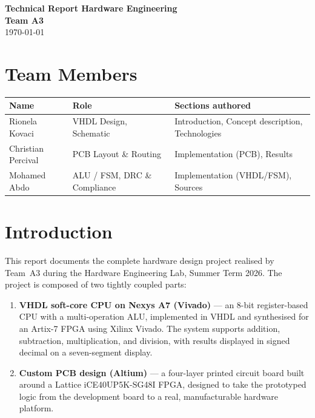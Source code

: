 \documentclass[11pt,a4paper]{article}
\begin{document}
\setlength{\parskip}{5pt}

\begin{center}
  {\LARGE\bfseries Technical Report Hardware Engineering}\\[0.35cm]
  {\large\bfseries Team A3}\\[0.15cm]
  {\large\today}
\end{center}

\vspace{0.3cm}
\tableofcontents


\section*{Team Members}

\begin{center}
\begin{tabular}{lll}
  \toprule
  \textbf{Name} & \textbf{Role} & \textbf{Sections authored} \\
  \midrule
  Rionela Kovaci    & VHDL Design, Schematic      & Introduction, Concept description, Technologies \\
  Christian Percival & PCB Layout \& Routing       & Implementation (PCB), Results \\
  Mohamed Abdo      & ALU / FSM, DRC \& Compliance & Implementation (VHDL/FSM), Sources \\
  \bottomrule
\end{tabular}
\end{center}

\section{Introduction}

This report documents the complete hardware design project realised by Team~A3
during the Hardware Engineering Lab, Summer Term 2026. The project is
composed of two tightly coupled parts:

\begin{enumerate}[leftmargin=2em, noitemsep]
  \item \textbf{VHDL soft-core CPU on Nexys A7 (Vivado)} — an 8-bit
        register-based CPU with a multi-operation ALU, implemented in VHDL and
        synthesised for an Artix-7 FPGA using Xilinx Vivado. The system
        supports addition, subtraction, multiplication, and division, with
        results displayed in signed decimal on a seven-segment display.

  \item \textbf{Custom PCB design (Altium)} — a four-layer printed
        circuit board built around a Lattice iCE40UP5K-SG48I FPGA, designed to
        take the prototyped logic from the development board to a real,
        manufacturable hardware platform.
\end{enumerate}
\end{document}
